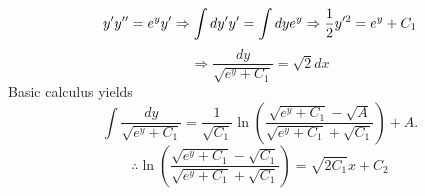 \item

\[
	y' y'' = e^y y'
	\Rightarrow \int dy' y' = \int dy e^y
	\Rightarrow \frac{1}{2} y'^2 = e^y + C_1
\]
\[
	\Rightarrow \frac{dy}{\sqrt{e^y + C_1}} = \sqrt{2} dx
\]
Basic calculus yields
\[
	\int \frac{dy}{\sqrt{e^y + C_1}}
	= \frac{1}{\sqrt{C_1}} \ln \left( \frac{\sqrt{e^y + C_1} - \sqrt{A}}{\sqrt{e^y + C_1} + \sqrt{C_1}} \right) + A.
\]
\[
	\therefore \ln \left( \frac{\sqrt{e^y + C_1} - \sqrt{C_1}}{\sqrt{e^y + C_1} + \sqrt{C_1}} \right) = \sqrt{2C_1}x + C_2
\]